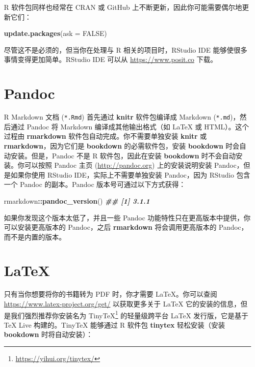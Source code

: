 \documentclass[
  12pt,
]{krantz}
\newenvironment{Shaded}{\begin{snugshade}}{\end{snugshade}}
\newcommand{\AttributeTok}[1]{\textcolor[rgb]{0.13,0.29,0.53}{#1}}
\newcommand{\ConstantTok}[1]{\textcolor[rgb]{0.56,0.35,0.01}{#1}}
\newcommand{\DocumentationTok}[1]{\textcolor[rgb]{0.56,0.35,0.01}{\textbf{\textit{#1}}}}
\newcommand{\FunctionTok}[1]{\textcolor[rgb]{0.13,0.29,0.53}{\textbf{#1}}}
\newcommand{\NormalTok}[1]{#1}
\newcommand{\SpecialCharTok}[1]{\textcolor[rgb]{0.81,0.36,0.00}{\textbf{#1}}}
\renewcommand{\href}[2]{#2\footnote{\url{#1}}}
\theoremstyle{definition}
\theoremstyle{definition}
\theoremstyle{definition}
\theoremstyle{definition}
\theoremstyle{remark}
\begin{document}
R 软件包同样也经常在 CRAN 或 GitHub 上不断更新，因此你可能需要偶尔地更新它们：

\begin{Shaded}
\begin{Highlighting}[]
\FunctionTok{update.packages}\NormalTok{(}\AttributeTok{ask =} \ConstantTok{FALSE}\NormalTok{)}
\end{Highlighting}
\end{Shaded}

尽管这不是必须的，但当你在处理与 R 相关的项目时，RStudio IDE 能够使很多事情变得更加简单。RStudio IDE 可以从 \url{https://www.posit.co} 下载。

\hypertarget{pandoc}{%
\section{Pandoc}\label{pandoc}}

R Markdown 文档 (\texttt{*.Rmd}) 首先通过 \textbf{knitr} 软件包编译成 Markdown (\texttt{*.md})，然后通过 Pandoc 将 Markdown 编译成其他输出格式（如 LaTeX 或 HTML）。这个过程由 \textbf{rmarkdown} 软件包自动完成。你不需要单独安装 \textbf{knitr} 或 \textbf{rmarkdown}，因为它们是 \textbf{bookdown} 的必需软件包，安装 \textbf{bookdown} 时会自动安装。但是，Pandoc 不是 R 软件包，因此在安装 \textbf{bookdown} 时不会自动安装。你可以按照 Pandoc 主页 (\url{http://pandoc.org}) 上的安装说明安装 Pandoc，但是如果你使用 RStudio IDE，实际上不需要单独安装 Pandoc，因为 RStudio 包含一个 Pandoc 的副本。Pandoc 版本号可通过以下方式获得：

\begin{Shaded}
\begin{Highlighting}[]
\NormalTok{rmarkdown}\SpecialCharTok{::}\FunctionTok{pandoc\_version}\NormalTok{()}
\DocumentationTok{\#\# [1] \textquotesingle{}3.1.1\textquotesingle{}}
\end{Highlighting}
\end{Shaded}

如果你发现这个版本太低了，并且一些 Pandoc 功能特性只在更高版本中提供，你可以安装更高版本的 Pandoc，之后 \textbf{rmarkdown} 将会调用更高版本的 Pandoc，而不是内置的版本。

\hypertarget{latex}{%
\section{LaTeX}\label{latex}}

只有当你想要将你的书籍转为 PDF 时，你才需要 LaTeX。你可以查阅 \url{https://www.latex-project.org/get/} 以获取更多关于 LaTeX 它的安装的信息，但是我们强烈推荐你安装名为 \href{https://yihui.org/tinytex/}{TinyTeX} 的轻量级跨平台 LaTeX 发行版，它是基于 TeX Live 构建的。TinyTeX 能够通过 R 软件包 \textbf{tinytex} 轻松安装（安装 \textbf{bookdown} 时将自动安装）：
\end{document}
